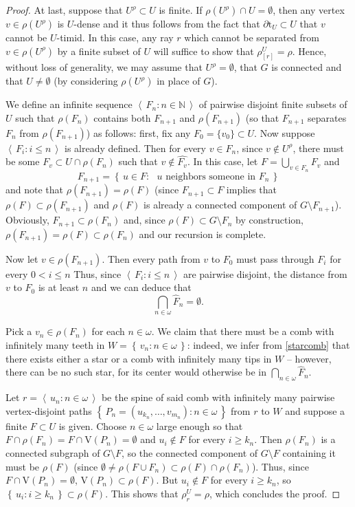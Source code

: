 \documentclass[10pt]{article}
\newcommand{\myref}[1]{\hyperref[#1]{\namecref{#1} \ref{#1}}}
\numberwithin{equation}{subsection}
\theoremstyle{remark}
\newcommand{\set}[1]{\left\{\, {#1} \,\right\}}
\newcommand{\seq}[1]{{\left\langle \, {#1} \,\right\rangle}}
\begin{document}
\begin{proof}
    At last, suppose that $U^\rho\subset U$ is finite. If $\rho(U^\rho)\cap U=\emptyset$, then any vertex $v\in \rho(U^\rho)$ is $U$-dense and it thus follows from the fact that $\partial \mathrm{t}_U\subset U$ that $v$ cannot be $U$-timid. In this case, any ray $r$ which cannot be separated from $v\in \rho(U^\rho)$ by a finite subset of $U$ will suffice to show that $\rho_{[r]}^U = \rho$. Hence, without loss of generality, we may assume that $U^\rho=\emptyset$, that $G$ is connected and that $U\neq\emptyset$ (by considering $\rho(U^\rho)$ in place of $G$). 
    
    We define an infinite sequence $\seq{F_n:n\in \mathbb{N}}$ of pairwise disjoint finite subsets of $U$ such that $\rho(F_n)$ contains both $F_{n+1}$ and $\rho(F_{n+1})$ (so that $F_{n+1}$ separates $F_n$ from $\rho(F_{n+1})$) as follows: first, fix any $F_0 = \{v_0\}\subset U$. Now suppose $\seq{F_i:i\le n}$ is already defined. Then for every $v\in F_n$, since $v\notin U^\rho$, there must be some $F_v\subset U\cap \rho(F_n)$ such that $v\notin \hat{F_v}$. In this case, let $F = \bigcup_{v\in F_n}F_v$ and
    \[F_{n+1} = \set{u\in F: \text{ $u$ neighbors someone in $F_n$}}\]
    and note that $\rho(F_{n+1}) = \rho(F)$ (since $F_{n+1}\subset F$ implies that $\rho(F)\subset \rho(F_{n+1})$ and $\rho(F)$ is already a connected component of $G\setminus F_{n+1}$). Obviously, $F_{n+1}\subset \rho(F_n)$ and, since $\rho(F)\subset G\setminus F_n$ by construction, $\rho(F_{n+1}) = \rho(F)\subset \rho(F_n)$ and our recursion is complete.

    Now let $v\in \rho(F_{n+1})$. Then every path from $v$ to $F_0$ must pass through $F_i$ for every $0<i\le n$ Thus, since $\seq{F_i:i\le n}$ are pairwise disjoint, the distance from $v$ to $F_0$ is at least $n$ and we can deduce that 
    \[
    \bigcap_{n\in\omega}\hat{F}_n = \emptyset.
    \]
    
    Pick a $v_n\in \rho(F_n)$ for each $n\in\omega$. We claim that there must be a comb with infinitely many teeth in $W = \set{v_n:n\in\omega}$: indeed, we infer from \myref{starcomb} that there exists either a star or a comb with infinitely many tips in $W$ -- however, there can be no such star, for its center would otherwise be in $\bigcap_{n\in\omega}\hat{F}_n$. 
    
    Let $r = \seq{u_n:n\in\omega}$ be the spine of said comb with infinitely many pairwise vertex-disjoint paths $\set{P_n=(u_{k_n}, \dotsc, v_{m_n}):n\in\omega}$ from $r$ to $W$ and suppose a finite $F\subset U$ is given. Choose $n\in\omega$ large enough so that $F\cap \rho(F_n)=F\cap \mathrm{V}(P_n)=\emptyset$ and $u_i\notin F$ for every $i\ge k_n$. Then $\rho(F_n)$ is a connected subgraph of $G\setminus F$, so the connected component of $G\setminus F$ containing it must be $\rho(F)$ (since $\emptyset\neq\rho(F\cup F_n)\subset \rho(F)\cap\rho(F_n)$). Thus, since $F\cap \mathrm{V}(P_n)=\emptyset$, $\mathrm{V}(P_n)\subset \rho(F)$. But $u_i\notin F$ for every $i\ge k_n$, so $\set{u_i:i\ge k_n}\subset \rho(F)$. This shows that $\rho_r^U = \rho$, which concludes the proof.
\end{proof}
\end{document}
